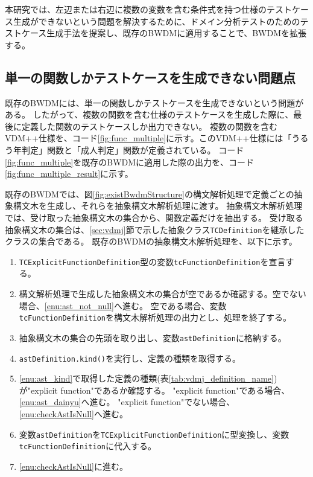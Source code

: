 \documentclass[uplatex, report, a4j, 10pt]{jsbook}
\newcommand\ttt[1]{\texttt{#1}}
\newcommand{\tool}{BWDM}
\begin{document}
本研究では、左辺または右辺に複数の変数を含む条件式を持つ仕様のテストケース生成ができないという問題を解決するために、ドメイン分析テストのためのテストケース生成手法を提案し、既存のBWDMに適用することで、BWDMを拡張する。

\subsection{単一の関数しかテストケースを生成できない問題点}\label{sec:probrem_only_function}
既存の\tool{}には、単一の関数しかテストケースを生成できないという問題がある。
したがって、複数の関数を含む仕様のテストケースを生成した際に、最後に定義した関数のテストケースしか出力できない。
複数の関数を含むVDM++仕様を、コード\ref{fig:func_multiple}に示す。このVDM++仕様には「うるう年判定」関数と「成人判定」関数が定義されている。
コード\ref{fig:func_multiple}を既存のBWDMに適用した際の出力を、コード\ref{fig:func_multiple_result}に示す。

既存のBWDMでは、図\ref{fig:existBwdmStructure}の構文解析処理で定義ごとの抽象構文木を生成し、それらを抽象構文木解析処理に渡す。
抽象構文木解析処理では、受け取った抽象構文木の集合から、関数定義だけを抽出する。
受け取る抽象構文木の集合は、\ref{sec:vdmj}節で示した抽象クラス\ttt{TCDefinition}を継承したクラスの集合である。
既存のBWDMの抽象構文木解析処理を、以下に示す。

\newcommand{\TCExplicitFunctionDefinition}{\ttt{TCExplicitFunctionDefinition}}
\newcommand{\tcFunctionDefinition}{\ttt{tcFunctionDefinition}}
\newcommand{\astDefinition}{\ttt{astDefinition}}

\begin{enumerate}
  \item \TCExplicitFunctionDefinition{}型の変数\tcFunctionDefinition{}を宣言する。
  \item\label{enu:checkAstIsNull} 構文解析処理で生成した抽象構文木の集合が空であるか確認する。空でない場合、\ref{enu:ast_not_null}へ進む。
        空である場合、変数\tcFunctionDefinition{}を構文木解析処理の出力とし、処理を終了する。
  \item\label{enu:ast_not_null} 抽象構文木の集合の先頭を取り出し、変数\astDefinition{}に格納する。
  \item\label{enu:ast_kind} \astDefinition{}\ttt{.kind()}を実行し、定義の種類を取得する。
  \item \ref{enu:ast_kind}で取得した定義の種類(表\ref{tab:vdmj_definition_name})が"explicit function"であるか確認する。
        "explicit function"である場合、\ref{enu:ast_dainyu}へ進む。
        "explicit function"でない場合、\ref{enu:checkAstIsNull}へ進む。
  \item\label{enu:ast_dainyu} 変数\astDefinition{}を\TCExplicitFunctionDefinition{}に型変換し、変数\tcFunctionDefinition{}に代入する。
  \item \ref{enu:checkAstIsNull}に進む。
\end{enumerate}
\end{document}
